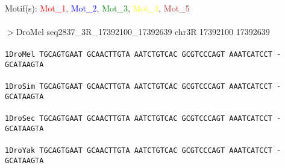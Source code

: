 \documentclass[11pt,twoside,reqno,a4paper]{article}
\begin{document}
\noindent
\newlength{\charwidth}Motif(s): \textcolor{Red}{Mot\_1}, \textcolor{Blue}{Mot\_2}, \textcolor{Green}{Mot\_3}, \textcolor{Yellow}{Mot\_4}, \textcolor{Brown}{Mot\_5}\\
\\
$>$DroMel	seq2837\_3R\_17392100\_17392639	chr3R	17392100	17392639 \\
 \\
\texttt{1\hspace*{3\charwidth}DroMel	TGCAGTGAAT	GCAACTTGTA	AATCTGTCAC	GCGTCCCAGT	AAATCATCCT	-GCATAAGTA	\\
\hspace*{4\charwidth}\hspace*{7\charwidth}\hspace*{1\charwidth}\hspace*{1\charwidth}\hspace*{1\charwidth}\hspace*{1\charwidth}\hspace*{1\charwidth}\hspace*{1\charwidth}\\
1\hspace*{3\charwidth}DroSim	TGCAGTGAAT	GCAACTTGTA	AATCTGTCAC	GCGTCCCAGT	AAATCATCCT	-GCATAAGTA	\\
\hspace*{4\charwidth}\hspace*{7\charwidth}\hspace*{1\charwidth}\hspace*{1\charwidth}\hspace*{1\charwidth}\hspace*{1\charwidth}\hspace*{1\charwidth}\hspace*{1\charwidth}\\
1\hspace*{3\charwidth}DroSec	TGCAGTGAAT	GCAACTTGTA	AATCTGTCAC	GCGTCCCAGT	AAATCATCCT	-GCATAAGTA	\\
\hspace*{4\charwidth}\hspace*{7\charwidth}\hspace*{1\charwidth}\hspace*{1\charwidth}\hspace*{1\charwidth}\hspace*{1\charwidth}\hspace*{1\charwidth}\hspace*{1\charwidth}\\
1\hspace*{3\charwidth}DroYak	TGCAGTGAAT	GCAACTTGTA	AATCTGTCAC	GCGTCCCAGT	AAATCATCCT	-GCATAAGTA	\\
}
\end{document}
